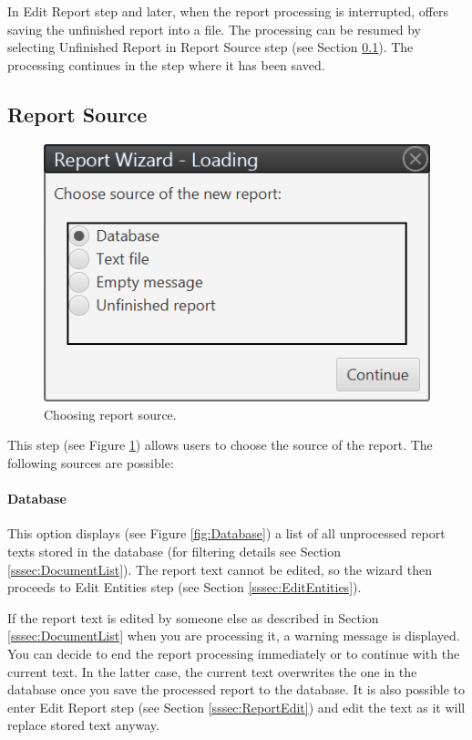 In Edit Report step and later, when the report processing is interrupted,
\textan{} offers saving the unfinished report into a file. The processing can
be resumed by selecting Unfinished Report in Report Source step (see Section
\ref{sssec:ReportSource}). The processing continues in the step where it has
been saved.

\subsection{Report Source}
\label{sssec:ReportSource}

\begin{figure}[!htb]
        \centering
        \includegraphics{Images/source}
        \caption{Choosing report source.}
        \label{fig:Source}
\end{figure}

This step (see Figure \ref{fig:Source}) allows users to choose the source of the
report. The following sources are possible:

\paragraph{Database} This option displays (see Figure \ref{fig:Database}) a list
of all unprocessed report texts stored in the database (for filtering details see
Section \ref{sssec:DocumentList}). The report text cannot be edited, so the
wizard then proceeds to Edit Entities step (see Section
\ref{sssec:EditEntities}).

If the report text is edited by someone else as described in Section
\ref{sssec:DocumentList} when you are processing it, a warning message is
displayed. You can decide to end the report processing immediately
or to continue with the current text. In the latter case, the current text
overwrites the one in the database once you save the processed report to the
database. It is also possible to enter Edit Report step (see Section
\ref{sssec:ReportEdit}) and edit the text as it will replace stored text anyway.

